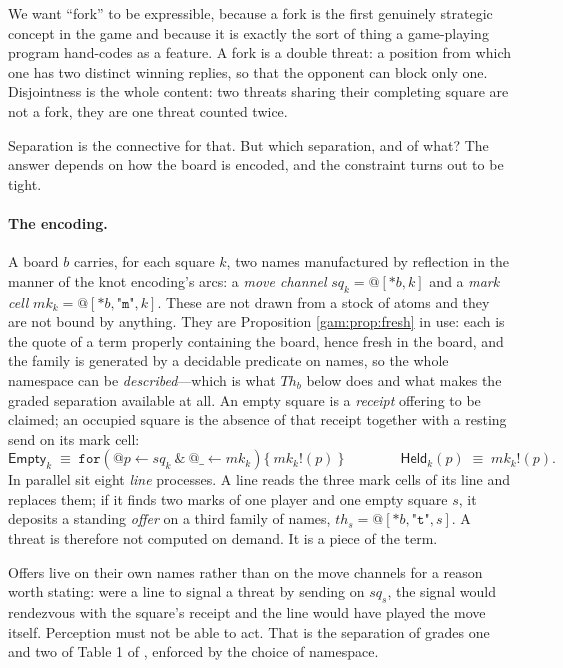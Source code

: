 We want ``fork'' to be expressible, because a fork is the first genuinely
strategic concept in the game and because it is exactly the sort of thing a
game-playing program hand-codes as a feature. A fork is a double threat: a
position from which one has two distinct winning replies, so that the opponent
can block only one. Disjointness is the whole content: two threats sharing their
completing square are not a fork, they are one threat counted twice.

Separation is the connective for that. But which separation, and of what? The
answer depends on how the board is encoded, and the constraint turns out to be
tight.

\paragraph{The encoding.} A board $b$ carries, for each square $k$, two names
manufactured by reflection in the manner of the knot encoding's arcs: a
\emph{move channel} $\mathit{sq}_k = @[*b,k]$ and a \emph{mark cell}
$\mathit{mk}_k = @[*b,\texttt{"m"},k]$. These are not drawn from a stock of
atoms and they are not bound by anything. They are Proposition \ref{gam:prop:fresh}
in use: each is the quote of a term properly containing the board, hence fresh
in the board, and the family is generated by a decidable predicate on names, so
the whole namespace can be \emph{described}---which is what
$\mathit{Th}_b$ below does and what makes the graded separation available at
all. An empty square is a \emph{receipt} offering to be
claimed; an occupied square is the absence of that receipt together with a
resting send on its mark cell:
\[
\mathsf{Empty}_k \;\equiv\; \texttt{for}(@p \leftarrow \mathit{sq}_k\ \&\ @\_
\leftarrow \mathit{mk}_k)\{\ \mathit{mk}_k!(p)\ \}
\qquad\qquad
\mathsf{Held}_k(p) \;\equiv\; \mathit{mk}_k!(p) .
\]
In parallel sit eight \emph{line} processes. A line reads the three mark cells
of its line and replaces them; if it finds two marks of one player and one empty
square $s$, it deposits a standing \emph{offer} on a third family of names,
$\mathit{th}_s = @[*b,\texttt{"t"},s]$. A threat is therefore not computed on
demand. It is a piece of the term.

Offers live on their own names rather than on the move channels for a reason
worth stating: were a line to signal a threat by sending on $\mathit{sq}_s$, the
signal would rendezvous with the square's receipt and the line would have played
the move itself. Perception must not be able to act. That is the separation of
grades one and two of Table 1 of \chSci, enforced by the choice of
namespace.

